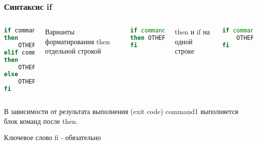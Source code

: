 \begin{frame}[fragile]
\frametitle{Синтаксис {\bf if}}

	\begin{columns}
	
	\begin{lstlisting}[language=bash]
if command1
then
    OTHER COMMANDS
elif command2
then
    OTHER COMMANDS
else
    OTHER COMMANDS
fi
\end{lstlisting}
Варианты форматирования
then отдельной строкой
	\begin{lstlisting}[language=bash]
if command
then OTHER COMMANDS 
fi
\end{lstlisting}

then и if на одной строке
	\begin{lstlisting}[language=bash]
if command; then 
    OTHER COMMANDS
fi
\end{lstlisting}
	\end{columns}

В зависимости от результата выполнения (exit code) command1 выполняется блок команд после then.   

Ключевое слово fi - обязательно

%
\end{frame}
